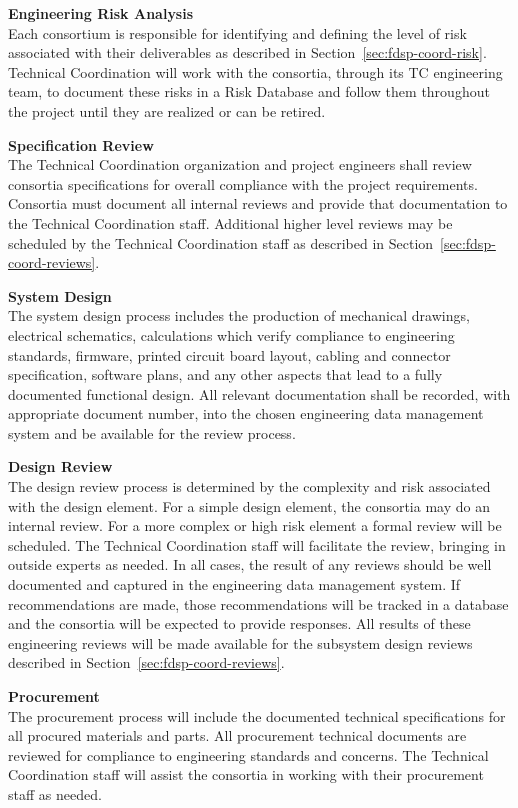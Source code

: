 {\bf Engineering Risk Analysis}\\ Each consortium is responsible for
identifying and defining the level of risk associated with their
deliverables as described in Section~\ref{sec:fdsp-coord-risk}.
 Technical Coordination will work with the consortia,
through its TC engineering team, to document these risks in a Risk
Database and follow them throughout the project until they are
realized or can be retired.

{\bf Specification Review}\\
The  Technical Coordination organization and project engineers
shall review consortia specifications for overall compliance with the
project requirements.  Consortia must document all internal reviews
and provide that documentation to the Technical Coordination staff.
Additional higher level reviews may be scheduled by the Technical
Coordination staff as described in Section~\ref{sec:fdsp-coord-reviews}.

{\bf System Design}\\
The system design process includes the production of mechanical
drawings, electrical schematics, calculations which verify compliance
to engineering standards, firmware, printed circuit board layout,
cabling and connector specification, software plans, and any other
aspects that lead to a fully documented functional design.  All
relevant documentation shall be recorded, with appropriate document
number, into the chosen engineering data management system and be
available for the review process.

{\bf Design Review}\\ The design review process is determined by the
complexity and risk associated with the design element.  For a simple
design element, the consortia may do an internal review.  For a more
complex or high risk element a formal review will be scheduled.  The
 Technical Coordination staff will facilitate the review,
bringing in outside experts as needed.  In all cases, the result of
any reviews should be well documented and captured in the engineering
data management system.  If recommendations are made, those
recommendations will be tracked in a database and the consortia will
be expected to provide responses. All results of these engineering
reviews will be made available for the subsystem design reviews
described in Section~\ref{sec:fdsp-coord-reviews}.

{\bf Procurement}\\ The procurement process will include the
documented technical specifications for all procured materials and
parts.  All procurement technical documents are reviewed for
compliance to engineering standards and  concerns.  The
 Technical Coordination staff will assist the consortia in
working with their procurement staff as needed.

